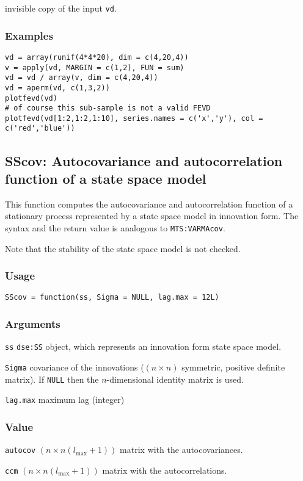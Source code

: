 \documentclass[]{article}
\begin{document}
invisible copy of the input \texttt{vd}. \subsubsection*{Examples}

\begin{verbatim}
vd = array(runif(4*4*20), dim = c(4,20,4))
v = apply(vd, MARGIN = c(1,2), FUN = sum)
vd = vd / array(v, dim = c(4,20,4))
vd = aperm(vd, c(1,3,2))
plotfevd(vd)
# of course this sub-sample is not a valid FEVD
plotfevd(vd[1:2,1:2,1:10], series.names = c('x','y'), col = c('red','blue'))
\end{verbatim}

\subsection{SScov: Autocovariance and autocorrelation function of a
state space
model}\label{sscov-autocovariance-and-autocorrelation-function-of-a-state-space-model}

This function computes the autocovariance and autocorrelation function
of a stationary process represented by a state space model in innovation
form. The syntax and the return value is analogous to
\texttt{MTS:VARMAcov}.

Note that the stability of the state space model is not checked.

\subsubsection*{Usage}\begin{verbatim}
SScov = function(ss, Sigma = NULL, lag.max = 12L)
\end{verbatim}\subsubsection*{Arguments}\begin{description}
\item \texttt{ss} \texttt{dse:SS} object, which represents an innovation
           form state space model.
\item \texttt{Sigma} covariance of the innovations 
             ($(n\times n)$ symmetric, positive definite matrix). 
             If \texttt{NULL} then the $n$-dimensional identity matrix is used.
\item \texttt{lag.max} maximum lag (integer)
\end{description}\subsubsection*{Value}\begin{description}
\item \texttt{autocov} $(n\times n(l_{\mbox{max}}+1))$ matrix with 
       the autocovariances.
\item \texttt{ccm} $(n\times n(l_{\mbox{max}}+1))$ matrix with 
       the autocorrelations.
\end{description}
\end{document}
